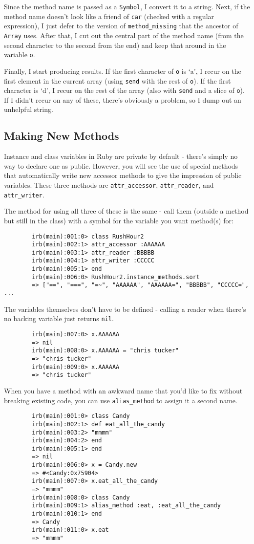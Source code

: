 \documentclass[12pt]{article}
\begin{document}
	Since the method name is passed as a \verb|Symbol|, I convert it to a string.  Next, if the method name doesn't look like a friend of \verb|car| (checked with a regular expression), I just defer to the version of \verb|method_missing| that the ancestor of \verb|Array| uses.  After that, I cut out the central part of the method name (from the second character to the second from the end) and keep that around in the variable \verb|o|.
	
	Finally, I start producing results.  If the first character of \verb|o| is `a', I recur on the first element in the current array (using \verb|send| with the rest of \verb|o|).  If the first character is `d', I recur on the rest of the array (also with \verb|send| and a slice of \verb|o|).  If I didn't recur on any of these, there's obviously a problem, so I dump out an unhelpful string.
	
	\subsection{Making New Methods}
	Instance and class variables in Ruby are private by default - there's simply no way to declare one as public.  However, you will see the use of special methods that automatically write new accessor methods to give the impression of public variables.  These three methods are \verb|attr_accessor|, \verb|attr_reader|, and \verb|attr_writer|.
	
	The method for using all three of these is the same - call them (outside a method but still in the class) with a symbol for the variable you want method(s) for:
	\begin{verbatim}
		irb(main):001:0> class RushHour2
		irb(main):002:1> attr_accessor :AAAAAA
		irb(main):003:1> attr_reader :BBBBB 
		irb(main):004:1> attr_writer :CCCCC
		irb(main):005:1> end
		irb(main):006:0> RushHour2.instance_methods.sort
		=> ["==", "===", "=~", "AAAAAA", "AAAAAA=", "BBBBB", "CCCCC=", ...
	\end{verbatim}
	The variables themselves don't have to be defined - calling a reader when there's no backing variable just returns \verb|nil|.
	\begin{verbatim}
		irb(main):007:0> x.AAAAAA
		=> nil
		irb(main):008:0> x.AAAAAA = "chris tucker"
		=> "chris tucker"
		irb(main):009:0> x.AAAAAA
		=> "chris tucker"
	\end{verbatim}
	
	When you have a method with an awkward name that you'd like to fix without breaking existing code, you can use \verb|alias_method| to assign it a second name.
	\begin{verbatim}
		irb(main):001:0> class Candy
		irb(main):002:1> def eat_all_the_candy
		irb(main):003:2> "mmmm"
		irb(main):004:2> end
		irb(main):005:1> end
		=> nil
		irb(main):006:0> x = Candy.new
		=> #<Candy:0x75904>
		irb(main):007:0> x.eat_all_the_candy
		=> "mmmm"
		irb(main):008:0> class Candy
		irb(main):009:1> alias_method :eat, :eat_all_the_candy
		irb(main):010:1> end
		=> Candy
		irb(main):011:0> x.eat
		=> "mmmm"
	\end{verbatim}
	
\end{document}

